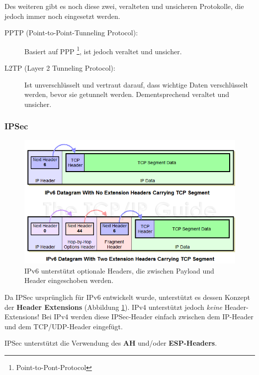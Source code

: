 \documentclass[a4paper, 11pt]{article}
\begin{document}
\noindent Des weiteren gibt es noch diese zwei, veralteten und unsicheren Protokolle, die jedoch immer noch eingesetzt werden.

\begin{description}
	\item[PPTP (Point-to-Point-Tunneling Protocol): ] Basiert auf PPP \footnote{Point-to-Pont-Protocol}, ist jedoch veraltet und unsicher.
	\item[L2TP (Layer 2 Tunneling Protocol): ] Ist unverschlüsselt und vertraut darauf, dass wichtige Daten verschlüsselt werden, bevor sie getunnelt werden. Dementsprechend veraltet und unsicher.
\end{description}

\newpage

\subsubsection{IPSec}

\begin{figure}
	\centering
	\includegraphics[keepaspectratio=true,height=10\baselineskip]{ipv6header.png}
	\caption{IPv6 unterstützt optionale Headers, die zwischen Payload und Header eingeschoben werden.}
	\label{fig:ipv6header}
\end{figure}


Da IPSec ursprünglich für IPv6 entwickelt wurde, unterstützt es dessen Konzept der \textbf{Header Extensions} (Abbildung \ref{fig:ipv6header}). IPv4 unterstützt jedoch \textit{keine} Header-Extensions! Bei IPv4 werden diese IPSec-Header einfach zwischen dem IP-Header und dem TCP/UDP-Header eingefügt.

\vspace{10px}

\noindent IPSec unterstützt die Verwendung des \textbf{AH} und/oder \textbf{ESP-Headers}.
\end{document}

